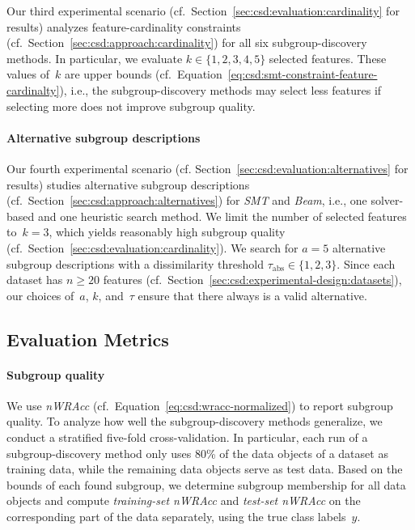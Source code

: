 \documentclass{article}
\theoremstyle{definition}
\begin{document}
Our third experimental scenario (cf.~Section~\ref{sec:csd:evaluation:cardinality} for results) analyzes feature-cardinality constraints (cf.~Section~\ref{sec:csd:approach:cardinality}) for all six subgroup-discovery methods.
In particular, we evaluate $k \in \{1, 2, 3, 4, 5\}$ selected features.
These values of~$k$ are upper bounds (cf.~Equation~\ref{eq:csd:smt-constraint-feature-cardinalty}), i.e., the subgroup-discovery methods may select less features if selecting more does not improve subgroup quality.

\paragraph{Alternative subgroup descriptions}

Our fourth experimental scenario (cf. Section~\ref{sec:csd:evaluation:alternatives} for results) studies alternative subgroup descriptions (cf.~Section~\ref{sec:csd:approach:alternatives}) for \emph{SMT} and \emph{Beam}, i.e., one solver-based and one heuristic search method.
We limit the number of selected features to~$k=3$, which yields reasonably high subgroup quality (cf.~Section~\ref{sec:csd:evaluation:cardinality}).
We search for $a=5$ alternative subgroup descriptions with a dissimilarity threshold $\tau_{\text{abs}} \in \{1, 2, 3\}$.
Since each dataset has $n \geq 20$ features (cf.~Section~\ref{sec:csd:experimental-design:datasets}), our choices of~$a$, $k$, and~$\tau$ ensure that there always is a valid alternative.

\subsection{Evaluation Metrics}
\label{sec:csd:experimental-design:metrics}

\paragraph{Subgroup quality}

We use \emph{nWRAcc} (cf.~Equation~\ref{eq:csd:wracc-normalized}) to report subgroup quality.
To analyze how well the subgroup-discovery methods generalize, we conduct a stratified five-fold cross-validation.
In particular, each run of a subgroup-discovery method only uses 80\% of the data objects of a dataset as training data, while the remaining data objects serve as test data.
Based on the bounds of each found subgroup, we determine subgroup membership for all data objects and compute \emph{training-set nWRAcc} and \emph{test-set nWRAcc} on the corresponding part of the data separately, using the true class labels~$y$.
\end{document}

